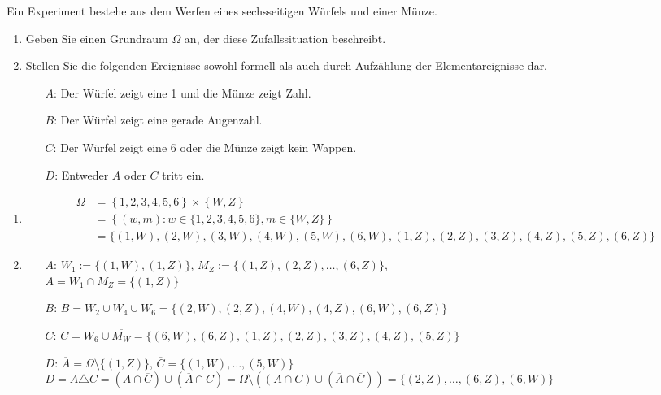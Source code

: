 Ein Experiment bestehe aus dem Werfen eines sechsseitigen Würfels und einer Münze.
\begin{enumerate}
    \item Geben Sie einen Grundraum $\Omega$ an, der diese Zufallssituation beschreibt.
    \item Stellen Sie die folgenden Ereignisse sowohl formell als auch durch Aufzählung der Elementareignisse dar.
    \begin{itemize}
      \item[$A$:] Der Würfel zeigt eine 1 und die Münze zeigt Zahl.
      \item[$B$:] Der Würfel zeigt eine gerade Augenzahl.
      \item[$C$:] Der Würfel zeigt eine 6 oder die Münze zeigt kein Wappen.
      \item[$D$:] Entweder $A$ oder $C$ tritt ein.
    \end{itemize}
\end{enumerate}
\solution
\begin{enumerate}
  \item \begin{align*}
           \Omega &= \left\{1,2,3,4,5,6\right\} \times \left\{W,Z\right\} \\ 
                  &= \left\{(w,m): w\in\{1,2,3,4,5,6\},m\in\{W,Z\} \right\} \\
                  &=\{(1,W), (2,W), (3,W), (4,W), (5,W), (6,W), 
                     (1,Z), (2,Z), (3,Z), (4,Z), (5,Z), (6,Z)\}
        \end{align*}
  \item 
    \begin{itemize}
      \item[$A$:] $W_1 := \{(1,W), (1,Z)\}$, $M_Z:=\{(1,Z), (2,Z), \hdots, (6,Z)\}$,\\
            $A = W_1 \cap M_Z = \{(1,Z)\}$
      \item[$B$:] $B = W_2\cup W_4\cup W_6 = \{(2,W), (2,Z), (4,W), (4,Z), (6,W), (6,Z)\}$
      \item[$C$:] $C = W_6 \cup \overline{M_W} = \{ (6,W), (6,Z), (1,Z), (2,Z), (3,Z), (4,Z), (5,Z) \}$
      \item[$D$:] $\overline{A} = \Omega\setminus \{(1,Z)\} $, $\overline{C} = \{(1,W),\hdots,(5,W)\}$ \\
            $D = A\triangle C = (A \cap \overline{C}) \cup (\overline{A} \cap C) = \Omega \setminus ( (A\cap C) \cup (\overline{A} \cap \overline{C})) = \{(2,Z), \hdots, (6,Z), (6,W)\}$  
    \end{itemize}
\end{enumerate}

